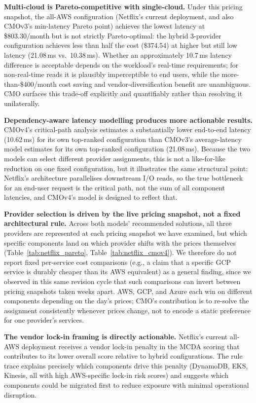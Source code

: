 \documentclass[journal]{IEEEtran}
\newcommand{\cmo}{CMO\xspace}
\newcommand{\cmothree}{CMOv3\xspace}
\newcommand{\cmofour}{CMOv4\xspace}
\begin{document}
\textbf{Multi-cloud is Pareto-competitive with single-cloud.}
Under this pricing snapshot, the all-AWS configuration (Netflix's current
deployment, and also \cmothree's min-latency Pareto point) achieves the lowest
latency at \$803.30/month but is not strictly Pareto-optimal: the hybrid
3-provider configuration achieves less than half the cost (\$374.54) at
higher but still low latency (21.08\,ms vs.\ 10.38\,ms). Whether an
approximately 10.7\,ms latency difference is acceptable depends on the
workload's real-time requirements; for non-real-time reads it is plausibly
imperceptible to end users, while the more-than-\$400/month cost saving and
vendor-diversification benefit are unambiguous. \cmo surfaces this trade-off
explicitly and quantifiably rather than resolving it unilaterally.

\textbf{Dependency-aware latency modelling produces more actionable results.}
\cmofour's critical-path analysis estimates a substantially lower end-to-end
latency (10.62\,ms) for its own top-ranked configuration than \cmothree's
average-latency model estimates for its own top-ranked configuration
(21.08\,ms). Because the two models can select different provider
assignments, this is not a like-for-like reduction on one fixed
configuration, but it illustrates the same structural point: Netflix's
architecture parallelises downstream I/O reads, so the true bottleneck for an
end-user request is the critical path, not the sum of all component
latencies, and \cmofour's model is designed to reflect that.

\textbf{Provider selection is driven by the live pricing snapshot, not a fixed
architectural rule.} Across both models' recommended solutions, all three
providers are represented at each pricing snapshot we have examined, but
which specific components land on which provider shifts with the prices
themselves (Table~\ref{tab:netflix_pareto}, Table~\ref{tab:netflix_cmov4}).
We therefore do not report fixed per-service cost comparisons (e.g., a claim
that a specific GCP service is durably cheaper than its AWS equivalent) as a
general finding, since we observed in this same revision cycle that such
comparisons can invert between pricing snapshots taken weeks apart. AWS,
GCP, and Azure each win on different components depending on the day's
prices; \cmo's contribution is to re-solve the assignment consistently
whenever prices change, not to encode a static preference for one provider's
services.

\textbf{The vendor lock-in framing is directly actionable.}
Netflix's current all-AWS deployment receives a vendor lock-in penalty in the
MCDA scoring that contributes to its lower overall score relative to hybrid
configurations. The rule trace explains precisely which components drive this
penalty (DynamoDB, EKS, Kinesis, all with high AWS-specific lock-in risk
scores) and suggests which components could be migrated first to reduce exposure
with minimal operational disruption.
\end{document}
